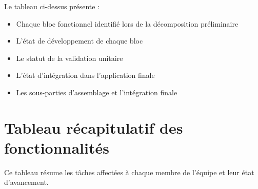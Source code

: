 \documentclass[12pt]{article}
\begin{document}
Le tableau ci-dessus présente :
\begin{itemize}
    \item Chaque bloc fonctionnel identifié lors de la décomposition préliminaire
    \item L'état de développement de chaque bloc
    \item Le statut de la validation unitaire
    \item L'état d'intégration dans l'application finale
    \item Les sous-parties d'assemblage et l'intégration finale
\end{itemize}


\section{Tableau récapitulatif des fonctionnalités}
Ce tableau résume les tâches affectées à chaque membre de l'équipe et leur état d'avancement.
\end{document}

